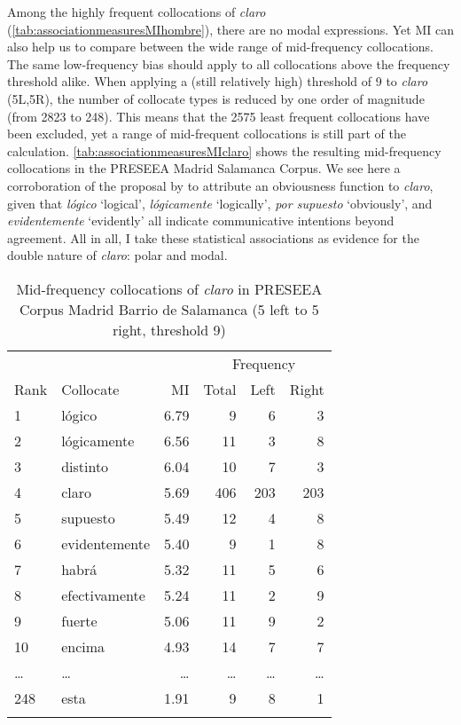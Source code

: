 Among the highly frequent collocations of \textit{claro} (\autoref{tab:associationmeasuresMIhombre}), there are no modal expressions. Yet \ac{MI} can also help us to compare between the wide range of mid-frequency collocations. The same low-frequency bias should apply to all collocations above the frequency threshold alike. When applying a (still relatively high) threshold of 9 to \textit{claro} (5L,5R), the number of collocate types is reduced by one order of magnitude (from 2823 to 248). This means that the 2575 least frequent collocations have been excluded, yet a range of mid-frequent collocations is still part of the calculation. \autoref{tab:associationmeasuresMIclaro} shows the resulting mid-frequency collocations in the PRESEEA Madrid Salamanca Corpus. We see here a corroboration of the proposal by \citet{PonsBorderia.2011} to attribute an obviousness function to \textit{claro}, given that \textit{lógico} `logical', \textit{lógicamente} `logically', \textit{por supuesto} `obviously', and \textit{evidentemente} `evidently' all indicate communicative intentions beyond agreement. All in all, I take these statistical associations as evidence for the double nature of \textit{claro}: polar and modal.\largerpage[2]

\begin{table}
	\begin{tabular}{ll *4{r}}
		\lsptoprule
		     &           &    & \multicolumn{3}{c}{Frequency}\\\cmidrule(lr){4-6}
		Rank & Collocate & MI & Total & Left& Right\\\midrule
		1 & lógico & 6.79 & 9 & 6 & 3 \\
		2 & lógicamente & 6.56 & 11 & 3 & 8 \\
		3 & distinto & 6.04 & 10 & 7 & 3 \\
		4 & claro & 5.69 & 406 & 203 & 203 \\
		5 & supuesto & 5.49 & 12 & 4 & 8 \\
		6 & evidentemente & 5.40 & 9 & 1 & 8 \\
		7 & habrá & 5.32 & 11 & 5 & 6 \\
		8 & efectivamente & 5.24 & 11 & 2 & 9 \\
		9 & fuerte & 5.06 & 11 & 9 & 2 \\
		10 & encima & 4.93 & 14 & 7 & 7 \\
		\ldots & \ldots & \ldots & \ldots & \ldots & \ldots \\
		248 & esta & 1.91 & 9 & 8 & 1 \\
		\lspbottomrule 
	\end{tabular}
	\caption{Mid-frequency collocations of \textit{claro} in PRESEEA Corpus Madrid Barrio de Salamanca (5 left to 5 right, threshold 9)\label{tab:associationmeasuresMIclaro}}
\end{table}

